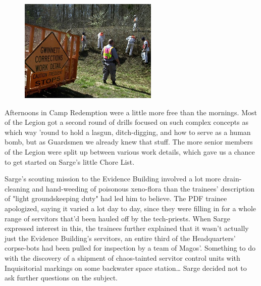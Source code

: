 \begin{figure}
	\begin{center}
		\includegraphics[width=\figwidth]{pics/21/20.png}
	\end{center}
\end{figure}
Afternoons in Camp Redemption were a little more free than the mornings. 
Most of the Legion got a second round of drills focused on such complex concepts as which way 'round to hold a lasgun, ditch-digging, and how to serve as a human bomb, but as Guardsmen we already knew that stuff. 
The more senior members of the Legion were split up between various work details, which gave us a chance to get started on Sarge's little Chore List.

Sarge's scouting mission to the Evidence Building involved a lot more drain-cleaning and hand-weeding of poisonous xeno-flora than the trainees' description of "light groundskeeping duty" had led him to believe. 
The PDF trainee apologized, saying it varied a lot day to day, since they were filling in for a whole range of servitors that'd been hauled off by the tech-priests. 
When Sarge expressed interest in this, the trainees further explained that it wasn't actually just the Evidence Building's servitors, an entire third of the Headquarters' corpse-bots had been pulled for inspection by a team of Magos'. 
Something to do with the discovery of a shipment of chaos-tainted servitor control units with Inquisitorial markings on some backwater space station… Sarge decided not to ask further questions on the subject.

